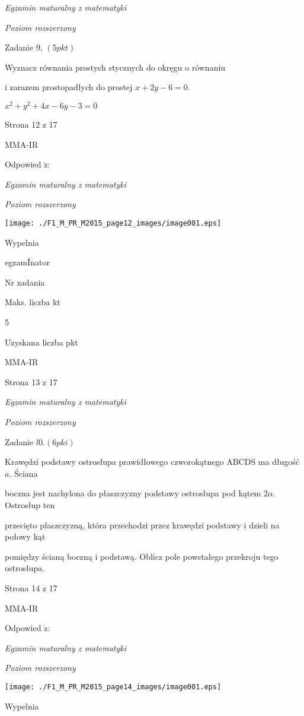 \documentclass[a4paper,12pt]{article}
\begin{document}
{\it Egzamin maturalny z matematyki}

{\it Poziom rozszerzony}

Zadanie 9, $(5pkt)$

Wyznacz równania prostych stycznych do okręgu o równaniu

i zarazem prostopadłych do prostej $x+2y-6=0.$

$x^{2}+y^{2}+4x-6y-3=0$

Strona 12 z 17

MMA-IR





Odpowied $\acute{\mathrm{z}}$:

{\it Egzamin maturalny z matematyki}

{\it Poziom rozszerzony}
\begin{center}
\texttt{[image: ./F1\_M\_PR\_M2015\_page12\_images/image001.eps]}
\end{center}
Wypelnia

egzamÍnator

Nr zadania

Maks. liczba kt

5

Uzyskana liczba pkt

MMA-IR

Strona 13 z 17





{\it Egzamin maturalny z matematyki}

{\it Poziom rozszerzony}

Zadanie $l0. (6pki)$

Krawędzí podstawy ostrosłupa prawidłowego czworokątnego ABCDS ma długość $a$. Ściana

boczna jest nachylona do płaszczyzny podstawy ostrosłupa pod kątem $ 2\alpha$. Ostrosłup ten

przecięto płaszczyzną, która przechodzi przez krawędzí podstawy i dzieli na połowy kąt

pomiędzy ścianą boczną i podstawą. Oblicz pole powstałego przekroju tego ostrosłupa.

Strona 14 z 17

MMA-IR





Odpowied $\acute{\mathrm{z}}$:

{\it Egzamin maturalny z matematyki}

{\it Poziom rozszerzony}
\begin{center}
\texttt{[image: ./F1\_M\_PR\_M2015\_page14\_images/image001.eps]}
\end{center}
Wypelnia
\end{document}
